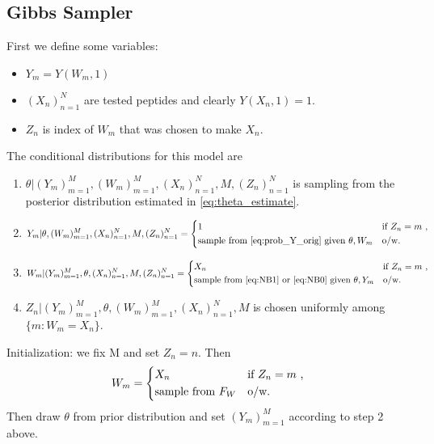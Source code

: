 \documentclass[12pt]{article}
\begin{document}
\subsection{Gibbs Sampler}
First we define some variables:
\begin{itemize}
    \item
    $Y_m=Y(W_m,1)$
    \item
    $(X_n)_{n=1}^N$ are tested peptides and clearly $Y(X_n,1)=1$.
    \item
    $Z_n$ is index of $W_m$ that was chosen to make $X_n$.
\end{itemize}
The conditional distributions for this model are
\begin{enumerate}
    \item
    $\theta | (Y_m)_{m=1}^M, (W_m)_{m=1}^M, (X_n)_{n=1}^N, M, (Z_n)_{n=1}^N$ is sampling from the posterior distribution estimated in \eqref{eq:theta_estimate}.
    \item
    \begin{equation*}
    Y_m | \theta, (W_m)_{m=1}^M, (X_n)_{n=1}^N, M, (Z_n)_{n=1}^N =
    \begin{dcases}
    1 & \text{if $Z_n=m$ , } \\
    \text{sample from \eqref{eq:prob_Y_orig} given $\theta, W_m$} & \text{o/w.}
    \end{dcases}
    \end{equation*}
    \item
    \begin{equation*}
    W_m | (Y_m)_{m=1}^M, \theta, (X_n)_{n=1}^N, M, (Z_n)_{n=1}^N =
    \begin{dcases}
    X_n & \text{if $Z_n=m$ , } \\
    \text{sample from \eqref{eq:NB1} or \eqref{eq:NB0} given $\theta, Y_m$} & \text{o/w.}
    \end{dcases}
    \end{equation*}
    \item
    $Z_n | (Y_m)_{m=1}^M, \theta, (W_m)_{m=1}^M, (X_n)_{n=1}^N, M$ is chosen uniformly among $\{m:W_m=X_n\}$.
\end{enumerate}
Initialization: we fix M and set $Z_n=n$. Then 
\begin{equation*}
W_m =
\begin{dcases}
X_n & \text{if $Z_n=m$ , } \\
\text{sample from $F_W$} & \text{o/w.}
\end{dcases}
\end{equation*}
Then draw $\theta$ from prior distribution and set $(Y_m)_{m=1}^M$ according to step 2 above.
\end{document}
